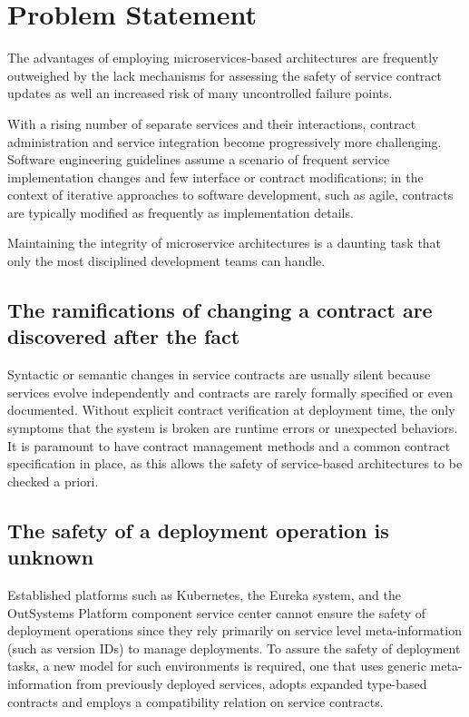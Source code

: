 \section{Problem Statement} %
\label{sec:problem_statement}

The advantages of employing microservices-based architectures are frequently outweighed by the lack mechanisms for assessing the safety of service contract updates
as well an increased risk of many uncontrolled failure points.

With a rising number of separate services and their interactions, contract administration and service integration become progressively more challenging.
Software engineering guidelines assume a scenario of frequent service implementation changes and few interface or contract modifications;
in the context of iterative approaches to software development, such as agile, contracts are typically modified as frequently as implementation details.

Maintaining the integrity of microservice architectures is a daunting task that only the most disciplined development teams can handle.

\subsection{The ramifications of changing a contract are discovered after the fact}
Syntactic or semantic changes in service contracts are usually silent because services evolve independently and contracts are rarely formally specified or even documented.
Without explicit contract verification at deployment time, the only symptoms that the system is broken are runtime errors or unexpected behaviors.
It is paramount to have contract management methods and a common contract specification in place, as this allows the safety of service-based architectures to be checked a priori.

\subsection{The safety of a deployment operation is unknown}
Established platforms such as Kubernetes, the Eureka system, and the OutSystems Platform component service center
cannot ensure the safety of deployment operations since they rely primarily on service level meta-information (such as version IDs) to manage deployments.
To assure the safety of deployment tasks, a new model for such environments is required,
one that uses generic meta-information from previously deployed services, adopts expanded type-based contracts and employs a compatibility relation on service contracts.

